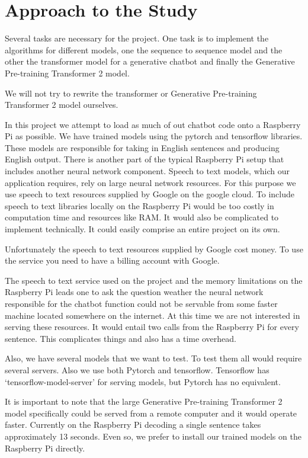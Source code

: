 \section{Approach to the Study}

Several tasks are necessary for the project. One task is to implement the algorithms for different models, one the sequence to sequence model and the other the transformer model for a generative chatbot and finally the Generative Pre-training Transformer 2 model.

We will not try to rewrite the transformer or Generative Pre-training Transformer 2 model ourselves.

In this project we attempt to load as much of out chatbot code onto a Raspberry Pi as possible. We have trained models using the pytorch and tensorflow libraries. These models are responsible for taking in English sentences and producing English output. There is another part of the typical Raspberry Pi setup that includes another neural network component. Speech to text models, which our application requires, rely on large neural network resources. For this purpose we use speech to text resources supplied by Google on the google cloud. To include speech to text libraries locally on the Raspberry Pi would be too costly in computation time and resources like RAM. It would also be complicated to implement technically. It could easily comprise an entire project on its own.

Unfortunately the speech to text resources supplied by Google cost money. To use the service you need to have a billing account with Google.

The speech to text service used on the project and the memory limitations on the Raspberry Pi leads one to ask the question weather the neural network responsible for the chatbot function could not be servable from some faster machine located somewhere on the internet. At this time we are not interested in serving these resources. It would entail two calls from the Raspberry Pi for every sentence. This complicates things and also has a time overhead. 

Also, we have several models that we want to test. To test them all would require several servers. Also we use both Pytorch and tensorflow. Tensorflow has `tensorflow-model-server' for serving models, but Pytorch has no equivalent.

It is important to note that the large Generative Pre-training Transformer 2 model specifically could be served from a remote computer and it would operate faster. Currently on the Raspberry Pi decoding a single sentence takes approximately 13 seconds. Even so, we prefer to install our trained models on the Raspberry Pi directly.

